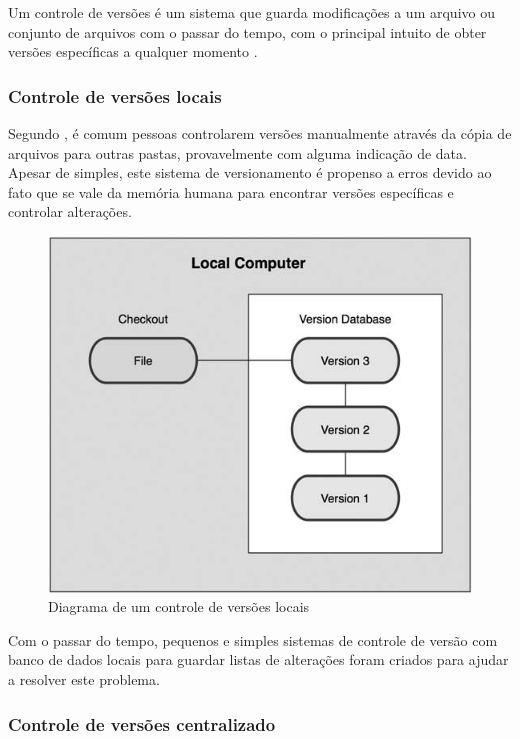Um controle de versões é um sistema que guarda modificações a um arquivo ou conjunto de arquivos com o passar do tempo, com o principal intuito de obter versões específicas a qualquer momento \cite[p. 1]{progit}.


\subsubsection{Controle de versões locais}

Segundo \cite[p.2]{progit}, é comum pessoas controlarem versões manualmente através da cópia de arquivos para outras pastas, provavelmente com alguma indicação de data. Apesar de simples, este sistema de versionamento é propenso a erros devido ao fato que se vale da memória humana para encontrar versões específicas e controlar alterações.

\begin{figure} [ht]
	\centering
	\includegraphics[scale=0.4]{local_version_control.png}
	\caption{Diagrama de um controle de versões locais \cite[p. 1]{progit}}
	\label{local_version_control}
\end{figure}

Com o passar do tempo, pequenos e simples sistemas de controle de versão com banco de dados locais para guardar listas de alterações foram criados para ajudar a resolver este problema.

\subsubsection{Controle de versões centralizado}

